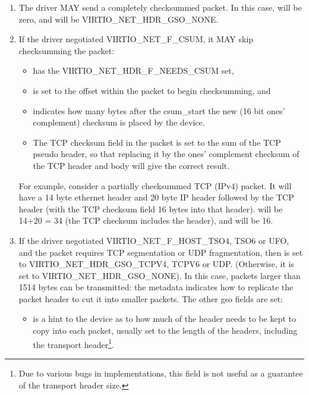 \begin{enumerate}
\item The driver MAY send a completely checksummed packet.  In this case,
   will be zero, and  will be VIRTIO_NET_HDR_GSO_NONE.

\item If the driver negotiated VIRTIO_NET_F_CSUM, it MAY skip
  checksumming the packet:
  \begin{itemize}
  \item {} has the VIRTIO_NET_HDR_F_NEEDS_CSUM set,

  \item {} is set to the offset within the packet to begin checksumming,
    and

  \item {} indicates how many bytes after the csum_start the
    new (16 bit ones' complement) checksum is placed by the device.

  \item The TCP checksum field in the packet is set to the sum
    of the TCP pseudo header, so that replacing it by the ones'
    complement checksum of the TCP header and body will give the
    correct result.
  \end{itemize}

\begin{note}
For example, consider a partially checksummed TCP (IPv4) packet.
It will have a 14 byte ethernet header and 20 byte IP header
followed by the TCP header (with the TCP checksum field 16 bytes
into that header).  will be 14+20 = 34 (the TCP
checksum includes the header), and  will be 16.
\end{note}

\item If the driver negotiated
  VIRTIO_NET_F_HOST_TSO4, TSO6 or UFO, and the packet requires
  TCP segmentation or UDP fragmentation, then 
  is set to VIRTIO_NET_HDR_GSO_TCPV4, TCPV6 or UDP.
  (Otherwise, it is set to VIRTIO_NET_HDR_GSO_NONE). In this
  case, packets larger than 1514 bytes can be transmitted: the
  metadata indicates how to replicate the packet header to cut it
  into smaller packets. The other gso fields are set:

  \begin{itemize}
  \item {} is a hint to the device as to how much of the header
    needs to be kept to copy into each packet, usually set to the
    length of the headers, including the transport header\footnote{Due to various bugs in implementations, this field is not useful
as a guarantee of the transport header size.
}.


\end{itemize}
\end{enumerate}
